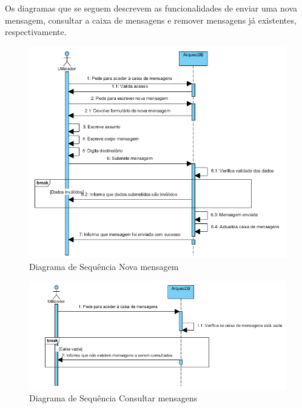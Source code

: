 \documentclass[12pt,a4paper]{article}
\begin{document}
\clearpage

Os diagramas que se seguem descrevem as funcionalidades de enviar uma nova mensagem, consultar a caixa de mensagens e remover mensagens já existentes, respectivamente.\\

\begin{figure}[h!]
\centering
\includegraphics[scale=1]{sequencia/enviarmensagem}
\caption{Diagrama de Sequência Nova mensagem} 
\end{figure}

\begin{figure}[h!]
\centering
\includegraphics[scale=0.8]{sequencia/consultarmensagem}
\caption{Diagrama de Sequência Consultar mensagens} 
\end{figure}
\end{document}
